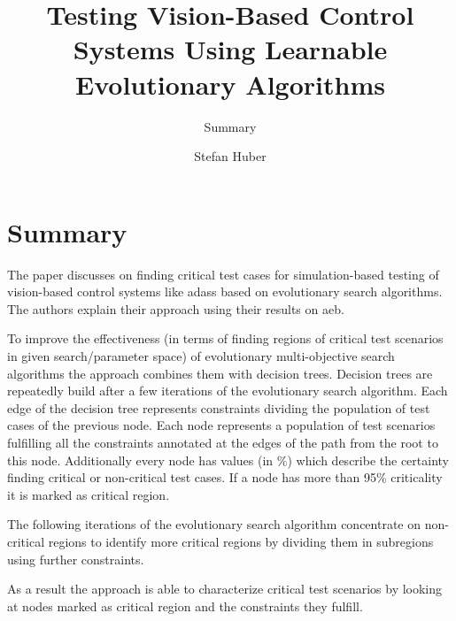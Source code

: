 \documentclass[oneside, notitlepage, twocolumn]{scrartcl}
\title{\LARGE Testing Vision-Based Control Systems Using Learnable Evolutionary Algorithms}
\subtitle{Summary}
\author{Stefan Huber}
\begin{document}
\maketitle

\section{Summary}
The paper discusses on finding critical test cases for simulation-based testing of vision-based control systems like \glspl{adas} based on evolutionary search algorithms.
The authors explain their approach using their results on \gls{aeb}.\par
To improve the effectiveness (in terms of finding regions of critical test scenarios in given search/parameter space) of evolutionary multi-objective search algorithms the approach combines them with decision trees.
Decision trees are repeatedly build after a few iterations of the evolutionary search algorithm.
Each edge of the decision tree represents constraints dividing the population of test cases of the previous node.
Each node represents a population of test scenarios fulfilling all the constraints annotated at the edges of the path from the root to this node.
Additionally every node has values (in \%) which describe the certainty finding critical or non-critical test cases.
If a node has more than 95\% criticality it is marked as critical region.\par
The following iterations of the evolutionary search algorithm concentrate on non-critical regions to identify more critical regions by dividing them in subregions using further constraints.\par
As a result the approach is able to characterize critical test scenarios by looking at nodes marked as critical region and the constraints they fulfill.
\end{document}
